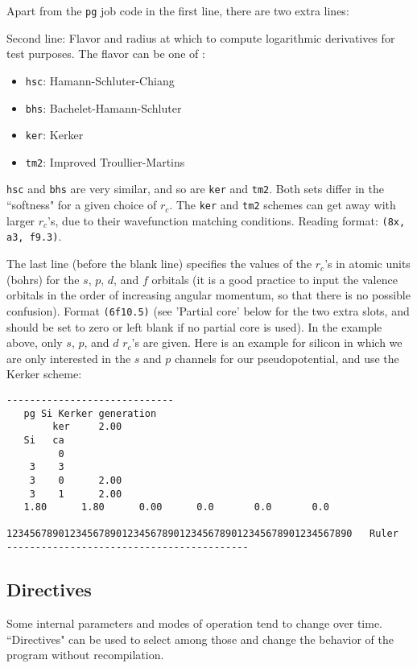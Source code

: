 \documentclass[11pt]{article}
\begin{document}
Apart from the {\tt pg} job code in the first line, there are two
extra lines:

Second line: Flavor and radius at which to compute logarithmic
derivatives for test purposes. The flavor can be one of :
\begin{itemize}
\item
{\tt hsc}: Hamann-Schluter-Chiang
\item
{\tt bhs}: Bachelet-Hamann-Schluter
\item
{\tt ker}: Kerker
\item
{\tt tm2}: Improved Troullier-Martins
\end{itemize}

{\tt hsc} and {\tt bhs} are very similar, and so are {\tt ker} and {\tt tm2}. 
Both sets differ in the ``softness" for a given choice of $r_c$. 
The {\tt ker} and {\tt tm2} schemes can get away with larger $r_c$'s, 
due to their wavefunction matching conditions.
Reading format: {\tt (8x, a3, f9.3)}.

The last line (before the blank line) specifies the values of the $r_c$'s
in atomic units (bohrs) for the $s$, $p$, $d$, and $f$ orbitals (it is a good
practice to input the valence orbitals in the order of increasing
angular momentum, so that there is no possible confusion).
Format {\tt (6f10.5)}  (see 'Partial core' below for the two extra slots,
and should be set to zero or left blank if no partial core is used). 
In the example above, only $s$, $p$, and $d$ $r_c$'s are given. Here is an 
example for silicon in which we are only interested in the $s$ and $p$ 
channels for our pseudopotential, and use the Kerker scheme:

\begin{verbatim}
-----------------------------
   pg Si Kerker generation
        ker     2.00
   Si   ca
         0
    3    3
    3    0      2.00
    3    1      2.00
   1.80      1.80      0.00      0.0       0.0       0.0

123456789012345678901234567890123456789012345678901234567890   Ruler
------------------------------------------
\end{verbatim}

\subsection{Directives}

Some internal parameters and modes of operation tend to change over
time. ``Directives" can be used to select among those
and change the behavior of the program without recompilation.
\end{document}
